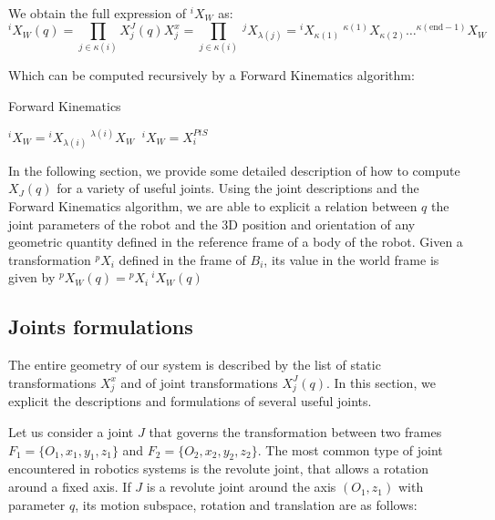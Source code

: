 We obtain the full expression of ${}^i X_W$ as:
\begin{equation}
  {}^i X_W (q) = \prod_{j\in\kappa (i)}X^J_j (q) X^x_j = \prod_{j\in\kappa (i)}\ {}^j X_{\lambda (j)}
  = {}^i X_{\kappa (1)}\ ^{\kappa (1)}X_{\kappa (2)} \dots ^{\kappa (\text{end}-1)}X_{W}
\end{equation}

Which can be computed recursively by a Forward Kinematics algorithm:

\begin{algorithm}
  \caption{Forward Kinematics}
\label{FK}
\begin{algorithmic}
   ${}^i X_W = {}^i X_{\lambda (i)}\ ^{\lambda (i)}X_W$
  \Else$\ {}^i X_W = X^{PtS}_i$
  \EndIf{}
  \EndFor{}
\end{algorithmic}
\end{algorithm}

In the following section, we provide some detailed description of how to compute $X_J (q)$ for a variety of useful joints.
Using the joint descriptions and the Forward Kinematics algorithm, we are able to explicit a relation between $q$ the joint parameters of the robot and the 3D position and orientation of  any geometric quantity defined in the reference frame of a body of the robot.
Given a transformation ${}^p X_i$ defined in the frame of $B_i$, its value in the world frame is given by ${}^p X_W (q) = {}^p X_i\ {}^i X_W (q)$


\subsection{Joints formulations}
\label{sub:joints_formulations}


The entire geometry of our system is described by the list of static transformations $X^x_j$ and of joint transformations $X^J_j (q)$.
In this section, we explicit the descriptions and formulations of several useful joints.

Let us consider a joint $J$ that governs the transformation between two frames $F_1=\{O_1, x_1, y_1, z_1\}$ and $F_2=\{O_2, x_2, y_2, z_2\}$.
The most common type of joint encountered in robotics systems is the revolute joint, that allows a rotation around a fixed axis.
If $J$ is a revolute joint around the axis $(O_1,z_1)$ with parameter $q$, its motion subspace, rotation and translation are as follows:

